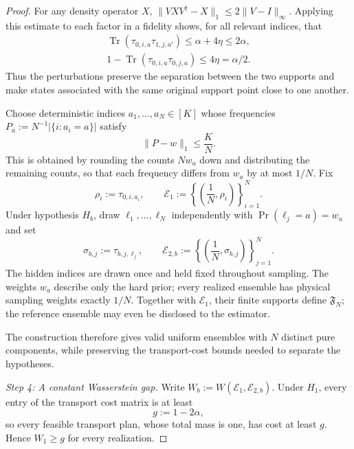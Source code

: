 \documentclass[aps,prx,reprint,superscriptaddress,amsmath,amssymb,longbibliography,floatfix]{revtex4-2}
\theoremstyle{plain}
\theoremstyle{definition}
\theoremstyle{remark}
\begin{document}
\begin{proof}
For any density operator $X$, $\|VXV^\dagger-X\|_1\le2\|V-I\|_\infty$. Applying this estimate to each factor in a fidelity shows, for all relevant indices, that
\begin{equation}
\begin{gathered}
\operatorname{Tr}(\tau_{0,i,a}\tau_{1,j,a'})\le\alpha+4\eta\le2\alpha,\\ 1-\operatorname{Tr}(\tau_{0,i,a}\tau_{0,j,a})\le4\eta=\alpha/2.
\end{gathered}
\label{eq:app-wasserstein-perturbed-costs}
\end{equation}
Thus the perturbations preserve the separation between the two supports and make states associated with the same original support point close to one another.

Choose deterministic indices $a_1,\ldots,a_N\in[K]$ whose frequencies $P_a:=N^{-1}|\{i:a_i=a\}|$ satisfy
\[
\|P-w\|_1\le\frac KN.
\]
This is obtained by rounding the counts $Nw_a$ down and distributing the remaining counts, so that each frequency differs from $w_a$ by at most $1/N$. Fix
\begin{equation}
\rho_i:=\tau_{0,i,a_i},\qquad \mathcal E_1:=\left\{\left(\frac1N,\rho_i\right)\right\}_{i=1}^N.
\label{eq:app-wasserstein-reference-ensemble}
\end{equation}
Under hypothesis $H_b$, draw $\ell_1,\ldots,\ell_N$ independently with $\Pr(\ell_j=a)=w_a$ and set
\begin{equation}
\sigma_{b,j}:=\tau_{b,j,\ell_j},\qquad \mathcal E_{2,b}:=\left\{\left(\frac1N,\sigma_{b,j}\right)\right\}_{j=1}^N.
\label{eq:app-wasserstein-comparison-ensembles}
\end{equation}
The hidden indices are drawn once and held fixed throughout sampling. The weights $w_a$ describe only the hard prior; every realized ensemble has physical sampling weights exactly $1/N$. Together with $\mathcal E_1$, their finite supports define $\mathfrak F_N$; the reference ensemble may even be disclosed to the estimator.

The construction therefore gives valid uniform ensembles with $N$ distinct pure components, while preserving the transport-cost bounds needed to separate the hypotheses.

\emph{Step 4: A constant Wasserstein gap.} Write $W_b:=W(\mathcal E_1,\mathcal E_{2,b})$. Under $H_1$, every entry of the transport cost matrix is at least
\[
g:=1-2\alpha,
\]
so every feasible transport plan, whose total mass is one, has cost at least $g$. Hence $W_1\ge g$ for every realization.


\end{proof}
\end{document}
